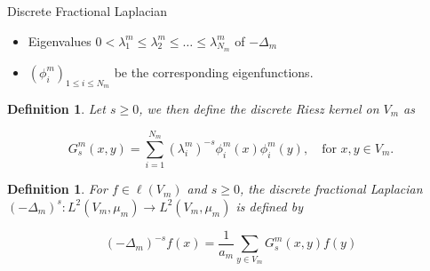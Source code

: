 \documentclass{beamer}
\newtheorem{defi}[theorems]{Definition}
\newcommand{\nl}{\newline}
\begin{document}
	
	\begin{frame}{Discrete Fractional Laplacian}
		
		\vspace{3em}
		\begin{itemize}
			\item<1-> Eigenvalues $0 < \lambda_1^{m} \leq \lambda_{2}^{m} \leq \ldots \leq \lambda_{N_m}^{m}$ of $-\Delta_m$ 
			\item<2-> $(\phi_i^{m})_{1 \leq i \leq N_m}$ be the corresponding eigenfunctions.
		\end{itemize}
		
		\pause
		\setcounter{theorems}{19}
		\begin{defi}
			Let $s \geq 0$, we then define the \emph{discrete Riesz kernel} on $V_m$ as
			
			\vspace{-1em}
			\begin{equation}
				G_s^{m}(x,y) = \sum_{i = 1}^{N_m} (\lambda_i^{m})^{-s} \phi_{i}^{m}(x)\phi_{i}^{m}(y), \quad \text{for }x, y \in V_m.
			\end{equation}
		\end{defi}
		\pause
	
	\begin{defi}\label{discreteFractionalLaplacian}
		For $f \in \ell(V_m)$ and $s \geq 0$, the \emph{discrete fractional Laplacian} \nl $(-\Delta_m)^{s}\colon L^{2}(V_m, \mu_m) \to L^{2}(V_m, \mu_m)$ is defined by
		
		\vspace{-0.8em}
		\begin{equation}
			(-\Delta_{m})^{-s}f(x) = \frac{1}{a_m} \sum_{y \in V_m} G_{s}^{m}(x,y)f(y)
		\end{equation}
	\end{defi}
	\end{frame}
	
\end{document}
